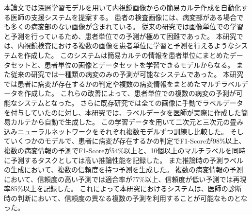 本論文では深層学習モデルを用いて内視鏡画像からの簡易カルテ作成を自動化する医師の支援システムを提案する。
患者の検査画像には、病変部がある場合でも多くの病変部のない画像が含まれている。
従来の研究では画像単位での学習と予測を行っているため、患者単位での予測が極めて困難であった。
本研究では、内視鏡検査における複数の画像を患者単位に学習と予測を行えるようなシステムを作成した。
このシステムは簡易カルテの情報を患者単位にまとめたデータセットと、患者単位の画像とデータセットを学習できるモデルからなる。
また従来の研究では一種類の病変のみの予測が可能なシステムであった。
本研究では患者に病変が存在するかの判定や複数の病変情報をまとめたマルチラベルデータを作成した。
これらの改善によって、患者単位での複数の病変の予測が可能なシステムとなった。
さらに既存研究では全ての画像に手動でラベルデータを付与していたのに対し、本研究では、ラベルデータを医師が実際に作成した簡易カルテから自動で生成した。
この学習データを用いて二次元と三次元の畳み込みニューラルネットワークをそれぞれ複数モデルずつ訓練し比較した。
そしていくつかのモデルで、患者に病変が存在するかの判定でF1-Scoreが98\%以上、複数の病変情報の予測でF1-Scoreが54\%以上と、10個以上のマルチラベルを同時に予測するタスクとしては高い推論性能を記録した。
また推論時の予測ラベルの生成において、複数の信頼度を持つ予測を生成した。
複数の病変情報の予測において、信頼度の高い予測では適合率が77\%以上、信頼度が低い予測では再現率85\%以上を記録した。
これによって本研究におけるシステムは、医師の診断時の判断において、信頼度の異なる複数の予測を利用することが可能なものとなった。
